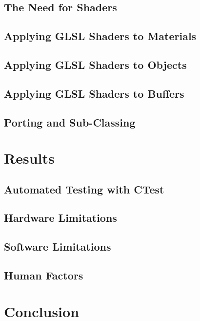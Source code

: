 \documentclass[MSc,paper=a4,pagesize=auto, doublespacing]{icldt}
\begin{document}
\section{The Need for Shaders}
\section{Applying GLSL Shaders to Materials}
\section{Applying GLSL Shaders to Objects}
\section{Applying GLSL Shaders to Buffers}
\section{Porting and Sub-Classing}

\chapter{Results}
\section{Automated Testing with CTest}
\section{Hardware Limitations}
\section{Software Limitations}
\section{Human Factors}

\chapter{Conclusion}
\cite{Nobody06}



\end{document}

